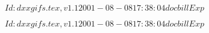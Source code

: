 \documentclass{article}
\begin{document}
$Id: dxxgifs.tex,v 1.1 2001-08-08 17:38:04 docbill Exp $


\pagebreak


$Id: dxxgifs.tex,v 1.1 2001-08-08 17:38:04 docbill Exp $


\pagebreak
\end{document}
